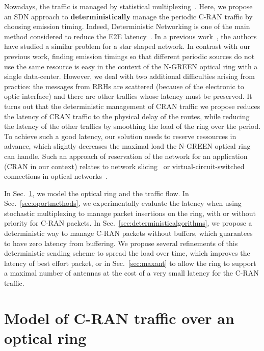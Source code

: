 \documentclass[10pt, conference, letterpaper]{IEEEtran}
\begin{document}
Nowadays, the traffic is managed by statistical multiplexing~\cite{kern2006applying}. Here, we propose an SDN approach to {\bf deterministically} manage the periodic C-RAN traffic by choosing emission timing. Indeed, Deterministic Networking is one of the main method considered to reduce the E2E latency~\cite{finn-detnet-architecture-08}. In a previous work~\cite{dominique2018deterministic}, the authors have studied a similar problem for a star shaped network. In contrast with our previous work, finding emission timings so that different periodic sources do not use the same resource is easy in the context of the N-GREEN optical ring with a single data-center. However, we deal with two additional difficulties arising from practice: the messages from RRHs are scattered (because of the electronic to optic interface) and there are other traffics whose latency must be preserved. It turns out that the deterministic management of CRAN traffic we propose reduces the latency of CRAN traffic to the physical delay of the routes, while reducing the latency of the other traffics by smoothing the load of the ring over the period. To achieve such a good latency, our solution needs to reserve ressources in advance, which slightly decreases the maximal load the N-GREEN optical ring can handle. Such an approach of reservation of the network for an application (CRAN in our context) relates to network slicing~\cite{jiang2016network} or virtual-circuit-switched connections in optical networks~\cite{cadere2010virtual,szymanski2016ultra}.

In Sec.~\ref{sec:model}, we model the optical ring and the traffic flow. In Sec.~\ref{sec:oportmethods}, we experimentally evaluate the latency when using stochastic multiplexing to manage packet insertions on the ring, with or without priority for C-RAN packets. In Sec.~\ref{sec:deterministicalgorithms}, we propose a deterministic way to manage C-RAN packets without buffers, which guarantees to have zero latency from buffering. We propose several refinements of this deterministic sending scheme to spread the load over time, which improves the latency of best effort packet, or in Sec.~\ref{sec:maxant} to allow the ring to support a maximal number of antennas at the cost of a very small latency for the C-RAN traffic. 

\section{Model of C-RAN traffic over an optical ring}
\label{sec:model}
    
\end{document}
